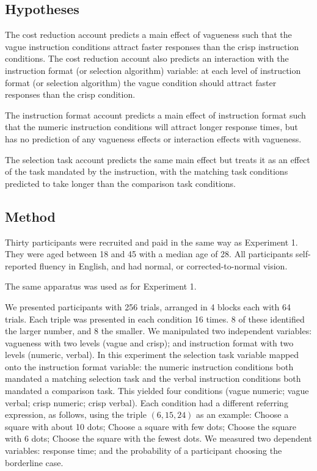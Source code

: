 \subsection{Hypotheses}
The cost reduction account predicts a main effect of vagueness such that the vague instruction conditions attract faster responses than the crisp instruction conditions. The cost reduction account also predicts an interaction with the instruction format (or selection algorithm) variable: at each level of instruction format (or selection algorithm) the vague condition should attract faster responses than the crisp condition.%

The instruction format account predicts a main effect of instruction format such that the numeric instruction conditions will attract longer response times, but has no prediction of any vagueness effects or interaction effects with vagueness.  

The selection task account predicts the same main effect but treats it as an effect of the task mandated by the instruction, with the matching task conditions predicted to take longer than the comparison task conditions.  


\subsection{Method}

Thirty participants were recruited and paid in the same way as Experiment 1. They were aged between 18 and 45 with a median age of 28. All participants self-reported fluency in English, and had normal, or corrected-to-normal vision.

The same apparatus was used as for Experiment 1.

We presented participants with 256 trials, arranged in 4 blocks each with 64 trials. Each triple was presented in each condition 16 times. 8 of these identified the larger number, and 8 the smaller. We manipulated two independent variables: vagueness with two levels (vague and crisp); and instruction format with two levels (numeric, verbal). In this experiment the selection task variable mapped onto the instruction format variable: the numeric instruction conditions both mandated a matching selection task and the verbal instruction conditions both mandated a comparison task. This yielded four conditions (vague numeric; vague verbal; crisp numeric; crisp verbal). Each condition had a different referring expression, as follows, using the triple $(6,15,24)$ as an example: Choose a square with about 10 dots; Choose a square with few dots; Choose the square with 6 dots; Choose the square with the fewest dots. We measured two dependent variables: response time; and the probability of a participant choosing the borderline case.

